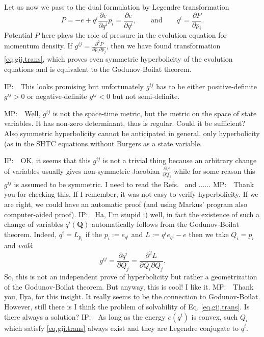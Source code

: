 \documentclass[
10pt, %
a4paper, %
oneside, %
headinclude,footinclude, %
BCOR5mm, %
]{scrartcl}
\newcommand{\QQ}{\mathbf{Q}}
\newcommand{\MP}[1]{{\color{Green}MP:\ \ #1}}
\newcommand{\IP}[1]{{\color{Red}IP:\ \ #1}}
\newcommand{\pd}{\partial}
\begin{document}
Let us now we pass to the dual formulation by Legendre transformation
\begin{subequations}
\begin{equation}
    P = -e + q^i \frac{\partial e}{\partial q^i}
\end{equation}
\begin{equation}
    p_i = \frac{\partial e}{\partial q^i}, 
\qquad\mbox{and}\qquad
q^i = \frac{\partial P}{\partial p_i}.
\end{equation}
\end{subequations}
Potential $P$ here plays the role of pressure in the evolution equation for momentum density. 
If $g^{ij} = \frac{\partial^2 P}{\partial p_i \partial p_j}$, then we have found transformation \eqref{eq.gij.trans}, which proves even symmetric hyperbolicity of the evolution equations and is equivalent to the Godunov-Boilat theorem.


\IP{This looks promising but unfortunately $g^{ij}$ has to be either positive-definite $g^{ij}>0$ or negative-definite $g^{ij}<0$ but not semi-definite.}

\MP{Well, $g^{ij}$ is not the space-time metric, but the metric on the space of state variables. It has non-zero determinant, thus is regular. Could it be sufficient? Also symmetric hyperbolicity cannot be anticipated in general, only hyperbolicity (as in the SHTC equations without Burgers as a state variable.}

\IP{OK, it seems that this $ g^{ij} $ is not a trivial thing because an arbitrary change of 
variables 
usually gives non-symmetric Jacobian $\frac{\partial q^i}{\partial Q_j}$ while for some reason this 
$ g^{ij} $ is assumed to be symmetric. I need to read the Refs.~\cite{Tsarev} and 
\cite{Novikov}......}
\MP{Thank you for checking this. If I remember, it was not easy to verify hyperbolicity. If we are 
right, we could have an automatic proof (and using Markus' program also computer-aided proof).}
\IP{Ha, I'm stupid :) well, in fact the existence of such a change of variables $ q^i(\QQ) $ 
automatically follows from the Godunov-Boilat theorem. Indeed, $ q^i = L_{p_i} $ if the $ p_i 
:=e_{q^i} $ and $ L:=q^i e_{q^i} - e $ then we take $ Q_i = p_i $ and \textit{voilà} 
\begin{equation}
g^{ij} = \frac{\pd q^i}{\pd Q_j} = \frac{\pd^2 L}{\pd Q_i\pd Q_j}.
\end{equation}
So, this is not an independent prove of hyperbolicity but rather a geometrization of the 
Godunov-Boilat theorem. But anyway, this is cool! I like it.
}
\MP{Thank you, Ilya, for this insight. It really seems to be the connection to Godunov-Boilat. However, still there is I think the problem of solvability of Eq. \eqref{eq.gij.trans}. Is there always a solution?}
\IP{As long as the energy $e(q^i)$ is convex, such $Q_i$ which satisfy \eqref{eq.gij.trans} always exist and they are Legendre conjugate to $q^i$.}
\end{document}
